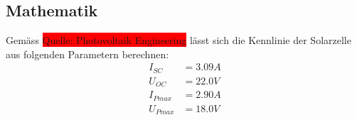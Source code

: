 \subsection{Mathematik}

Gemäss \colorbox{red}{Quelle: Photovoltaik Engineering} lässt sich die Kennlinie der Solarzelle aus folgenden Parametern berechnen:
\begin{equation}\begin{align}
	I_{SC} &= 3.09A \\
	U_{OC} &= 22.0V \\
	I_{Pmax} &= 2.90A \\
	U_{Pmax} &= 18.0V
\label{eq:eingangsparameter_kennlinie}
\end{align}\end{equation}